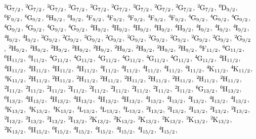\begin{mdframed}
\begin{center}
$\LSJterm{2}{G}{7/2}$, $\LSJterm{2}{G}{7/2}$, $\LSJterm{2}{G}{7/2}$, $\LSJterm{2}{G}{7/2}$, $\LSJterm{2}{G}{7/2}$, $\LSJterm{2}{G}{7/2}$, $\LSJterm{2}{G}{7/2}$, $\LSJterm{2}{G}{7/2}$, $\LSJterm{2}{G}{7/2}$, $\LSJterm{2}{G}{7/2}$, $\LSJterm{6}{D}{9/2}$, $\LSJterm{6}{F}{9/2}$, $\LSJterm{6}{G}{9/2}$, $\LSJterm{6}{H}{9/2}$, $\LSJterm{6}{I}{9/2}$, $\LSJterm{4}{F}{9/2}$, $\LSJterm{4}{F}{9/2}$, $\LSJterm{4}{F}{9/2}$, $\LSJterm{4}{F}{9/2}$, $\LSJterm{4}{F}{9/2}$, $\LSJterm{4}{G}{9/2}$, $\LSJterm{4}{G}{9/2}$, $\LSJterm{4}{G}{9/2}$, $\LSJterm{4}{G}{9/2}$, $\LSJterm{4}{G}{9/2}$, $\LSJterm{4}{G}{9/2}$, $\LSJterm{4}{G}{9/2}$, $\LSJterm{4}{H}{9/2}$, $\LSJterm{4}{H}{9/2}$, $\LSJterm{4}{H}{9/2}$, $\LSJterm{4}{H}{9/2}$, $\LSJterm{4}{H}{9/2}$, $\LSJterm{4}{I}{9/2}$, $\LSJterm{4}{I}{9/2}$, $\LSJterm{4}{I}{9/2}$, $\LSJterm{4}{I}{9/2}$, $\LSJterm{4}{I}{9/2}$, $\LSJterm{2}{G}{9/2}$, $\LSJterm{2}{G}{9/2}$, $\LSJterm{2}{G}{9/2}$, $\LSJterm{2}{G}{9/2}$, $\LSJterm{2}{G}{9/2}$, $\LSJterm{2}{G}{9/2}$, $\LSJterm{2}{G}{9/2}$, $\LSJterm{2}{G}{9/2}$, $\LSJterm{2}{G}{9/2}$, $\LSJterm{2}{G}{9/2}$, $\LSJterm{2}{H}{9/2}$, $\LSJterm{2}{H}{9/2}$, $\LSJterm{2}{H}{9/2}$, $\LSJterm{2}{H}{9/2}$, $\LSJterm{2}{H}{9/2}$, $\LSJterm{2}{H}{9/2}$, $\LSJterm{2}{H}{9/2}$, $\LSJterm{2}{H}{9/2}$, $\LSJterm{2}{H}{9/2}$, $\LSJterm{6}{F}{11/2}$, $\LSJterm{6}{G}{11/2}$, $\LSJterm{6}{H}{11/2}$, $\LSJterm{6}{I}{11/2}$, $\LSJterm{4}{G}{11/2}$, $\LSJterm{4}{G}{11/2}$, $\LSJterm{4}{G}{11/2}$, $\LSJterm{4}{G}{11/2}$, $\LSJterm{4}{G}{11/2}$, $\LSJterm{4}{G}{11/2}$, $\LSJterm{4}{G}{11/2}$, $\LSJterm{4}{H}{11/2}$, $\LSJterm{4}{H}{11/2}$, $\LSJterm{4}{H}{11/2}$, $\LSJterm{4}{H}{11/2}$, $\LSJterm{4}{H}{11/2}$, $\LSJterm{4}{I}{11/2}$, $\LSJterm{4}{I}{11/2}$, $\LSJterm{4}{I}{11/2}$, $\LSJterm{4}{I}{11/2}$, $\LSJterm{4}{I}{11/2}$, $\LSJterm{4}{K}{11/2}$, $\LSJterm{4}{K}{11/2}$, $\LSJterm{4}{K}{11/2}$, $\LSJterm{2}{H}{11/2}$, $\LSJterm{2}{H}{11/2}$, $\LSJterm{2}{H}{11/2}$, $\LSJterm{2}{H}{11/2}$, $\LSJterm{2}{H}{11/2}$, $\LSJterm{2}{H}{11/2}$, $\LSJterm{2}{H}{11/2}$, $\LSJterm{2}{H}{11/2}$, $\LSJterm{2}{H}{11/2}$, $\LSJterm{2}{I}{11/2}$, $\LSJterm{2}{I}{11/2}$, $\LSJterm{2}{I}{11/2}$, $\LSJterm{2}{I}{11/2}$, $\LSJterm{2}{I}{11/2}$, $\LSJterm{2}{I}{11/2}$, $\LSJterm{2}{I}{11/2}$, $\LSJterm{2}{I}{11/2}$, $\LSJterm{2}{I}{11/2}$, $\LSJterm{6}{G}{13/2}$, $\LSJterm{6}{H}{13/2}$, $\LSJterm{6}{I}{13/2}$, $\LSJterm{4}{H}{13/2}$, $\LSJterm{4}{H}{13/2}$, $\LSJterm{4}{H}{13/2}$, $\LSJterm{4}{H}{13/2}$, $\LSJterm{4}{H}{13/2}$, $\LSJterm{4}{I}{13/2}$, $\LSJterm{4}{I}{13/2}$, $\LSJterm{4}{I}{13/2}$, $\LSJterm{4}{I}{13/2}$, $\LSJterm{4}{I}{13/2}$, $\LSJterm{4}{K}{13/2}$, $\LSJterm{4}{K}{13/2}$, $\LSJterm{4}{K}{13/2}$, $\LSJterm{4}{L}{13/2}$, $\LSJterm{4}{L}{13/2}$, $\LSJterm{4}{L}{13/2}$, $\LSJterm{2}{I}{13/2}$, $\LSJterm{2}{I}{13/2}$, $\LSJterm{2}{I}{13/2}$, $\LSJterm{2}{I}{13/2}$, $\LSJterm{2}{I}{13/2}$, $\LSJterm{2}{I}{13/2}$, $\LSJterm{2}{I}{13/2}$, $\LSJterm{2}{I}{13/2}$, $\LSJterm{2}{I}{13/2}$, $\LSJterm{2}{K}{13/2}$, $\LSJterm{2}{K}{13/2}$, $\LSJterm{2}{K}{13/2}$, $\LSJterm{2}{K}{13/2}$, $\LSJterm{2}{K}{13/2}$, $\LSJterm{2}{K}{13/2}$, $\LSJterm{2}{K}{13/2}$, $\LSJterm{6}{H}{15/2}$, $\LSJterm{6}{I}{15/2}$, $\LSJterm{4}{I}{15/2}$, $\LSJterm{4}{I}{15/2}$, $\LSJterm{4}{I}{15/2}$, $\LSJterm{4}{I}{15/2}$, $\LSJterm{4}{I}{15/2}$, 
\end{center}
\end{mdframed}

